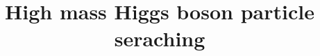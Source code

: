 \documentclass[PhD,binding=0.6cm]{../sapthesis}
\title{High mass Higgs boson particle seraching}
\begin{document}
\newcommand{\aMC}{\textsc{MadGraph}\xspace}
\newcommand{\qqbar}{$q \bar{q}$}
\newcommand{\POWHEG} {{\textsc{powheg}}\xspace}

\frontmatter

\maketitle

\dedication{ dedica a ...}


\begin{abstract}



\end{abstract}
\end{document}
